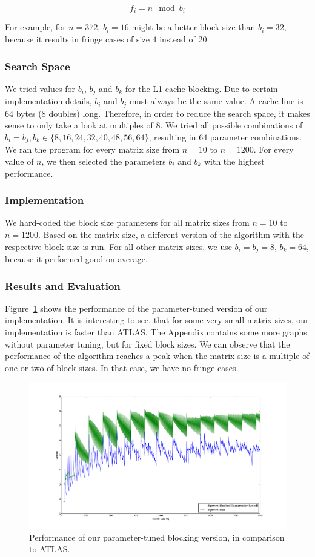 \documentclass[12pt]{article}
\begin{document}
$$f_i = n \mod b_i$$

For example, for $n=372$, $b_i=16$ might be a better block size than $b_i=32$, because it results in fringe cases of size $4$ instead of $20$.

\subsubsection{Search Space}
We tried values for $b_i$, $b_j$ and $b_k$ for the L1 cache blocking. Due to certain implementation details, $b_i$ and $b_j$ must always be the same value. A cache line is $64$ bytes ($8$ doubles) long. Therefore, in order to reduce the search space, it makes sense to only take a look at multiples of $8$. We tried all possible combinations of $b_i=b_j, b_k \in \{8, 16, 24, 32, 40, 48, 56, 64\}$, resulting in $64$ parameter combinations. We ran the program for every matrix size from $n=10$ to $n=1200$. For every value of $n$, we then selected the parameters $b_i$ and $b_k$ with the highest performance. 

\subsubsection{Implementation}
We hard-coded the block size parameters for all matrix sizes from $n=10$ to $n=1200$. Based on the matrix size, a different version of the algorithm with the respective block size is run. For all other matrix sizes, we use $b_i=b_j=8$, $b_k=64$, because it performed good on average.

\subsubsection{Results and Evaluation}
Figure~\ref{fig:param_results} shows the performance of the parameter-tuned version of our implementation. It is interesting to see, that for some very small matrix sizes, our implementation is faster than ATLAS. The Appendix contains some more graphs without parameter tuning, but for fixed block sizes. We can observe that the performance of the algorithm reaches a peak when the matrix size is a multiple of one or two of block sizes. In that case, we have no fringe cases.
\begin{figure}
	\includegraphics[width=\textwidth]{graphs/profiles/PROFILE_BLOCKED.pdf}
	\caption{Performance of our parameter-tuned blocking version, in comparison to ATLAS.}
	\label{fig:param_results}
\end{figure}
\end{document}
